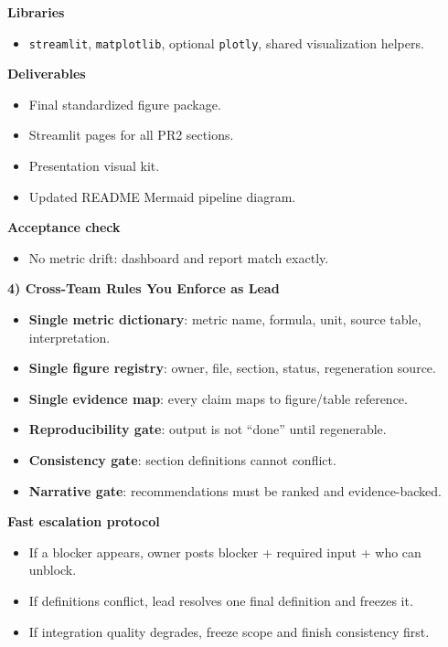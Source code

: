 \documentclass[10pt,letterpaper,twocolumn]{article}
\newcommand{\sectiontitle}[1]{\vspace{0.35em}\textbf{\large #1}\vspace{0.15em}}
\newcommand{\subhead}[1]{\textbf{#1}}
\begin{document}
\subhead{Libraries}
\begin{itemize}
  \item \texttt{streamlit}, \texttt{matplotlib}, optional \texttt{plotly}, shared visualization helpers.
\end{itemize}

\subhead{Deliverables}
\begin{itemize}
  \item Final standardized figure package.
  \item Streamlit pages for all PR2 sections.
  \item Presentation visual kit.
  \item Updated README Mermaid pipeline diagram.
\end{itemize}

\subhead{Acceptance check}
\begin{itemize}
  \item No metric drift: dashboard and report match exactly.
\end{itemize}

\sectiontitle{4) Cross-Team Rules You Enforce as Lead}
\begin{itemize}
  \item \textbf{Single metric dictionary}: metric name, formula, unit, source table, interpretation.
  \item \textbf{Single figure registry}: owner, file, section, status, regeneration source.
  \item \textbf{Single evidence map}: every claim maps to figure/table reference.
  \item \textbf{Reproducibility gate}: output is not ``done'' until regenerable.
  \item \textbf{Consistency gate}: section definitions cannot conflict.
  \item \textbf{Narrative gate}: recommendations must be ranked and evidence-backed.
\end{itemize}

\subhead{Fast escalation protocol}
\begin{itemize}
  \item If a blocker appears, owner posts blocker + required input + who can unblock.
  \item If definitions conflict, lead resolves one final definition and freezes it.
  \item If integration quality degrades, freeze scope and finish consistency first.
\end{itemize}
\end{document}
